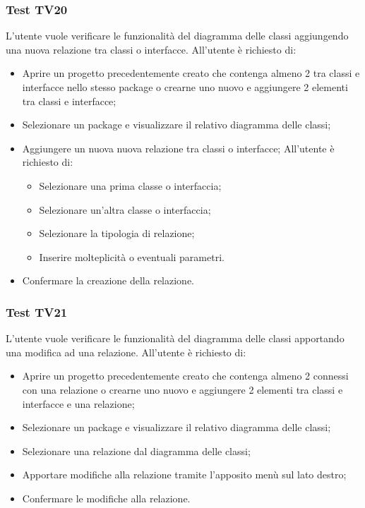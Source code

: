 \documentclass[../PianoDiQualifica.tex]{subfiles}
\begin{document}
	\subsubsection{Test TV20} 
	L'utente vuole verificare le funzionalità del diagramma delle classi aggiungendo una nuova relazione tra classi o interfacce. 
	All'utente è richiesto di: 
	\begin{itemize} 
		\item Aprire un progetto precedentemente creato che contenga almeno 2 tra classi e interfacce nello stesso package o crearne uno nuovo e aggiungere 2 elementi tra classi e interfacce;
		\item Selezionare un package e visualizzare il relativo diagramma delle classi; 
		\item Aggiungere un nuova nuova relazione tra classi o interfacce;  
		All'utente è richiesto di: 
		\begin{itemize} 
			\item Selezionare una prima classe o interfaccia; 
			\item Selezionare un'altra classe o interfaccia; 
			\item Selezionare la tipologia di relazione; 
			\item Inserire molteplicità o eventuali parametri. 
		\end{itemize} 
		\item Confermare la creazione della relazione. 
	\end{itemize} 
	
	
	\subsubsection{Test TV21} 
	L'utente vuole verificare le funzionalità del diagramma delle classi apportando una modifica ad una relazione. 
	All'utente è richiesto di: 
	\begin{itemize}  
		\item Aprire un progetto precedentemente creato che contenga almeno 2 connessi con una relazione o crearne uno nuovo e aggiungere 2 elementi tra classi e interfacce e una relazione;
		\item Selezionare un package e visualizzare il relativo diagramma delle classi; 
		\item Selezionare una relazione dal diagramma delle classi; 
		\item Apportare modifiche alla relazione tramite l'apposito menù sul lato destro; 
		\item Confermare le modifiche alla relazione. 
	\end{itemize} 
	
\end{document}
